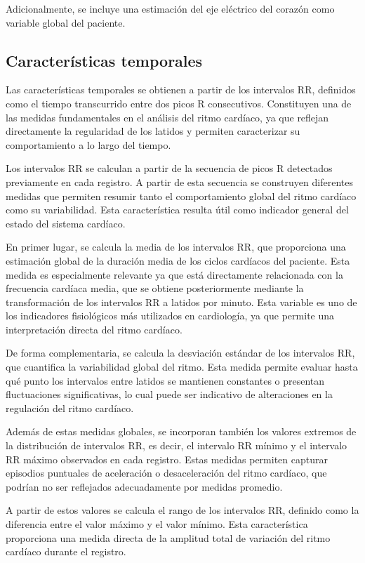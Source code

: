\documentclass[12pt,a4paper,twoside]{book}
\begin{document}
Adicionalmente, se incluye una estimación del eje eléctrico del corazón como variable global del paciente.

\subsection{Características temporales}

Las características temporales se obtienen a partir de los intervalos RR, definidos como el tiempo transcurrido entre dos picos R consecutivos.
Constituyen una de las medidas fundamentales en el análisis del ritmo cardíaco, ya que reflejan directamente la regularidad de los latidos y permiten caracterizar su comportamiento a lo largo del tiempo.

Los intervalos RR se calculan a partir de la secuencia de picos R detectados previamente en cada registro.
A partir de esta secuencia se construyen diferentes medidas que permiten resumir tanto el comportamiento global del ritmo cardíaco como su variabilidad.
Esta característica resulta útil como indicador general del estado del sistema cardíaco.

En primer lugar, se calcula la media de los intervalos RR, que proporciona una estimación global de la duración media de los ciclos cardíacos del paciente. 
Esta medida es especialmente relevante ya que está directamente relacionada con la frecuencia cardíaca media, que se obtiene posteriormente mediante la transformación de los intervalos RR a latidos por minuto. 
Esta variable es uno de los indicadores fisiológicos más utilizados en cardiología, ya que permite una interpretación directa del ritmo cardíaco.

De forma complementaria, se calcula la desviación estándar de los intervalos RR, que cuantifica la variabilidad global del ritmo. 
Esta medida permite evaluar hasta qué punto los intervalos entre latidos se mantienen constantes o presentan fluctuaciones significativas, lo cual puede ser indicativo de alteraciones en la regulación del ritmo cardíaco.

Además de estas medidas globales, se incorporan también los valores extremos de la distribución de intervalos RR, es decir, el intervalo RR mínimo y el intervalo RR máximo observados en cada registro. 
Estas medidas permiten capturar episodios puntuales de aceleración o desaceleración del ritmo cardíaco, que podrían no ser reflejados adecuadamente por medidas promedio.

A partir de estos valores se calcula el rango de los intervalos RR, definido como la diferencia entre el valor máximo y el valor mínimo. 
Esta característica proporciona una medida directa de la amplitud total de variación del ritmo cardíaco durante el registro.
\end{document}
